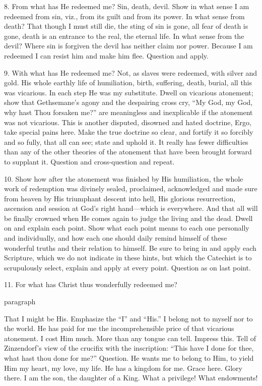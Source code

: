 8.  From what has He redeemed me? Sin, death, devil. Show in what sense I am redeemed from sin, viz., from its guilt and from its power. In what sense from death? That though I must still die, the sting of sin is gone, all fear of death is gone, death is an entrance to the real, the eternal life. In what sense from the devil? Where sin is forgiven the devil has neither claim nor power. Because I am redeemed I can resist him and make him flee. Question and apply.

9.  With what has He redeemed me? Not, as slaves were redeemed, with silver and gold. His whole earthly life of humiliation, birth, suffering, death, burial, all this was vicarious. In each step He was my substitute. Dwell on vicarious atonement; show that Gethsemane’s agony and the despairing cross cry, “My God, my God, why hast Thou forsaken me?” are meaningless and inexplicable if the atonement was not vicarious. This is another disputed, disowned and hated doctrine, Ergo, take special pains here. Make the true doctrine so clear, and fortify it so forcibly and so fully, that all can see; state and uphold it. It really has
fewer difficulties than any of the other theories of the atonement that have been brought forward to supplant it. Question and cross-question and repeat.

10.  Show how after the atonement was finished by His humiliation, the whole work of redemption was divinely sealed, proclaimed, acknowledged and made sure from heaven by His triumphant descent into hell, His glorious resurrection, ascension and session at God’s right hand—which is everywhere. And that all will be finally crowned when He comes again to judge the living and the dead. Dwell on and explain each point. Show what each point means to each one personally and individually, and how each one should daily remind himself of these wonderful truths and their relation to himself. Be sure to bring in and apply each Scripture, which we do not indicate in these hints, but which the Catechist is to scrupulously select, explain and apply at every point. Question as on last point.

11. For what has Christ thus wonderfully redeemed me?

paragraph

 That I might be His. Emphasize the “I” and “His.” I belong not to myself nor to the world. He has paid for me the incomprehensible price of that vicarious atonement. I cost Him much. More than any tongue can tell. Impress this. Tell of Zinzendorf’s view of the crucifix with the inscription: “This have I done for thee, what hast thou done for me?” Question.
He wants me to belong to Him, to yield Him my heart, my love, my life. He has a kingdom for me. Grace here. Glory there. I am the son, the daughter of a King. What a privilege! What endowments!

